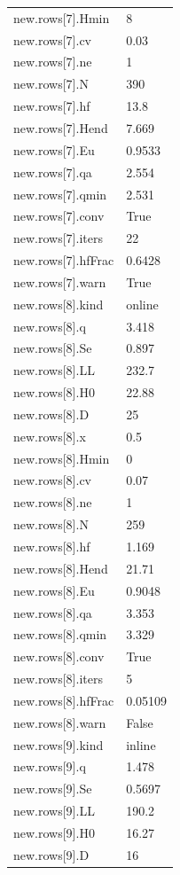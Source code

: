 {\begin{longtable}{p{}p{}}
{}new.rows[7].Hmin & 8\\
{}new.rows[7].cv & 0.03\\
{}new.rows[7].ne & 1\\
{}new.rows[7].N & 390\\
{}new.rows[7].hf & 13.8\\
{}new.rows[7].Hend & 7.669\\
{}new.rows[7].Eu & 0.9533\\
{}new.rows[7].qa & 2.554\\
{}new.rows[7].qmin & 2.531\\
{}new.rows[7].conv & True\\
{}new.rows[7].iters & 22\\
{}new.rows[7].hfFrac & 0.6428\\
{}new.rows[7].warn & True\\
{}new.rows[8].kind & online\\
{}new.rows[8].q & 3.418\\
{}new.rows[8].Se & 0.897\\
{}new.rows[8].LL & 232.7\\
{}new.rows[8].H0 & 22.88\\
{}new.rows[8].D & 25\\
{}new.rows[8].x & 0.5\\
{}new.rows[8].Hmin & 0\\
{}new.rows[8].cv & 0.07\\
{}new.rows[8].ne & 1\\
{}new.rows[8].N & 259\\
{}new.rows[8].hf & 1.169\\
{}new.rows[8].Hend & 21.71\\
{}new.rows[8].Eu & 0.9048\\
{}new.rows[8].qa & 3.353\\
{}new.rows[8].qmin & 3.329\\
{}new.rows[8].conv & True\\
{}new.rows[8].iters & 5\\
{}new.rows[8].hfFrac & 0.05109\\
{}new.rows[8].warn & False\\
{}new.rows[9].kind & inline\\
{}new.rows[9].q & 1.478\\
{}new.rows[9].Se & 0.5697\\
{}new.rows[9].LL & 190.2\\
{}new.rows[9].H0 & 16.27\\
{}new.rows[9].D & 16\\

\end{longtable}}
